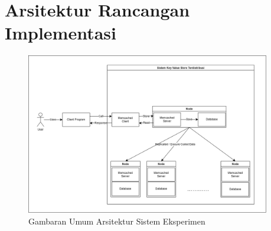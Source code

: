 \chapter{Arsitektur Rancangan Implementasi}
\label{appendix:architecture}

\begin{figure}[ht]
    \centering
    \includegraphics[width=0.95\textwidth]{resources/chapter-3/general-architecture.png}
    \caption{Gambaran Umum Arsitektur Sistem Eksperimen}
    \label{fig:general-architecture}
\end{figure}
